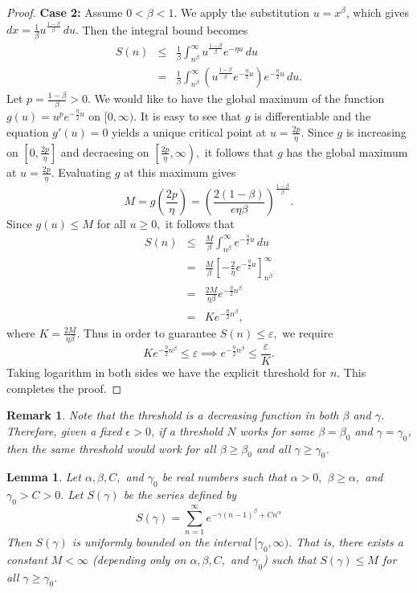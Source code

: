 \documentclass[a4paper,11pt,reqno]{amsart}
\theoremstyle{plain}
\newtheorem{lem}[thm]{Lemma}
\newtheorem{rem}[thm]{Remark}
\theoremstyle{mainthmstyle}
\theoremstyle{named}
\numberwithin{equation}{section}
\newcommand{\Bea}{\begin{eqnarray*}}
\newcommand{\Eea}{\end{eqnarray*}}
\begin{document}
\begin{proof}
\textbf{Case 2:} Assume $0 < \beta < 1$. We apply the substitution $u = x^\beta$, which gives $dx = \frac{1}{\beta} u^{\frac{1-\beta}{\beta}} \, du.$ Then the integral bound becomes
\Bea
    S(n) & \leq & \frac{1}{\beta} \int_{n^\beta}^{\infty} u^{\frac{1-\beta}{\beta}} e^{-\eta u} \, du \\ & = & \frac{1}{\beta} \int_{n^\beta}^{\infty} \left( u^{\frac{1-\beta}{\beta}} e^{-\frac{\eta}{2} u} \right) e^{-\frac{\eta}{2} u} \, du.
\Eea
Let $p = \frac{1-\beta}{\beta} > 0$. We would like to have the global maximum of the function $g(u) = u^p e^{-\frac{\eta}{2} u}$ on $[0, \infty).$ It is easy to see that $g$ is differentiable and the equation $g' (u) = 0$ yields a unique critical point at $u = \frac{2p}{\eta}.$ Since $g$ is increasing on $\left [0, \frac {2 p} {\eta} \right ]$ and decraesing on $\left [\frac {2 p} {\eta}, \infty \right ),$ it follows that $g$ has the global maximum at $u = \frac {2 p} {\eta}.$  Evaluating $g$ at this maximum gives
\begin{equation*}
    M = g\left(\frac{2p}{\eta}\right) = \left( \frac{2(1-\beta)}{e \eta \beta} \right)^{\frac{1-\beta}{\beta}}.
\end{equation*}
Since $g(u) \le M$ for all $u \ge 0,$ it follows that
\Bea
    S(n) & \leq & \frac{M}{\beta} \int_{n^\beta}^{\infty} e^{-\frac{\eta}{2} u} \, du \\
    & = & \frac{M}{\beta} \left[ -\frac{2}{\eta} e^{-\frac{\eta}{2} u} \right]_{n^\beta}^\infty \\
    & = & \frac{2M}{\eta \beta} e^{-\frac{\eta} {2} n^{\beta}} \\ & = & K e^{-\frac {\eta} {2} n^{\beta}},
\Eea
where $K = \frac{2M}{\eta \beta}.$ Thus in order to guarantee $S(n) \leq \varepsilon,$ we require
\begin{equation*}
    K e^{-\frac{\eta}{2} n^\beta} \le \varepsilon \implies e^{-\frac{\eta}{2} n^{\beta}} \le \frac{\varepsilon}{K}.
\end{equation*}
Taking logarithm in both sides we have the explicit threshold for $n.$ This completes the proof.
\end{proof}
\begin{rem} \label{gamma independence}
Note that the threshold is a decreasing function in both $\beta$ and $\gamma$. Therefore, given a fixed $\epsilon>0$, if a threshold $N$ works for some $\beta=\beta_0$ and $\gamma=\gamma_0$, then the same threshold would work for all $\beta\geq\beta_0$ and all $\gamma\geq \gamma_0$. 
\end{rem}
\begin{lem} \label{finiteness}
Let $\alpha, \beta, C,$ and $\gamma_0$ be real numbers such that $\alpha > 0,$ $\beta \geq \alpha,$ and $\gamma_0 > C > 0.$ Let $S(\gamma)$ be the series defined by
$$S(\gamma) = \sum\limits_{n = 1}^{\infty} e^{-\gamma (n - 1)^{\beta} + C n^{\alpha}}$$
Then $S(\gamma)$ is uniformly bounded on the interval $[\gamma_0, \infty).$ That is, there exists a constant $M < \infty$ (depending only on $\alpha, \beta, C,$ and $\gamma_0$) such that $S(\gamma) \leq M$ for all $\gamma \geq \gamma_0.$
\end{lem}
\end{document}
